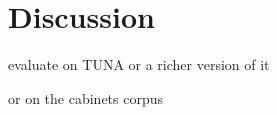 \section{Discussion} \label{sec:discussion}

evaluate on TUNA \cite{deemter06:_build_seman_trans_corpus_for} or a
richer version of it

or on the cabinets corpus
\cite{viethen06:_algor_for_gener_refer_expres}

